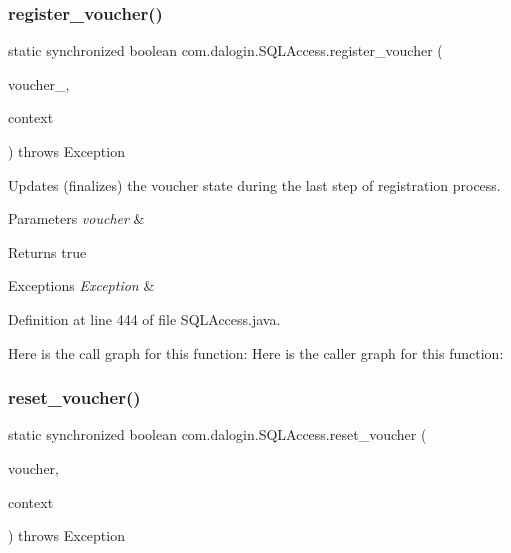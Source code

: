 \subsubsection{\texorpdfstring{register\+\_\+voucher()}{register\_voucher()}}
{\footnotesize\ttfamily static synchronized boolean com.\+dalogin.\+S\+Q\+L\+Access.\+register\+\_\+voucher (\begin{DoxyParamCaption}\item[{String}]{voucher\+\_\+,  }\item[{Servlet\+Context}]{context }\end{DoxyParamCaption}) throws Exception\hspace{0.3cm}{\ttfamily [static]}}

Updates (finalizes) the voucher state during the last step of registration process.


\begin{DoxyParams}{Parameters}
{\em voucher} & \\
\hline
\end{DoxyParams}
\begin{DoxyReturn}{Returns}
true 
\end{DoxyReturn}

\begin{DoxyExceptions}{Exceptions}
{\em Exception} & \\
\hline
\end{DoxyExceptions}


Definition at line 444 of file S\+Q\+L\+Access.\+java.

Here is the call graph for this function\+:
Here is the caller graph for this function\+:
\mbox{\label{classcom_1_1dalogin_1_1_s_q_l_access_ac4363153109eee19fab9866da32a6506}} 
\subsubsection{\texorpdfstring{reset\+\_\+voucher()}{reset\_voucher()}}
{\footnotesize\ttfamily static synchronized boolean com.\+dalogin.\+S\+Q\+L\+Access.\+reset\+\_\+voucher (\begin{DoxyParamCaption}\item[{String}]{voucher,  }\item[{Servlet\+Context}]{context }\end{DoxyParamCaption}) throws Exception\hspace{0.3cm}{\ttfamily [static]}}

